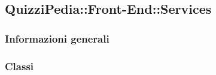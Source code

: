 \newpage

\subsection{QuizziPedia::Front-End::Services}
\subsubsection{Informazioni generali}
\subsubsection{Classi}
